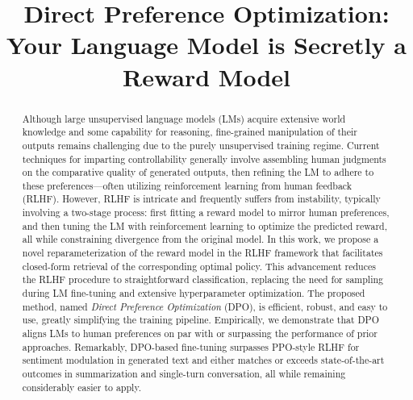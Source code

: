\title{Direct Preference Optimization: Your Language Model is Secretly a Reward Model}

\begin{abstract}
Although large unsupervised language models (LMs) acquire extensive world knowledge and some capability for reasoning, fine-grained manipulation of their outputs remains challenging due to the purely unsupervised training regime. Current techniques for imparting controllability generally involve assembling human judgments on the comparative quality of generated outputs, then refining the LM to adhere to these preferences—often utilizing reinforcement learning from human feedback (RLHF). However, RLHF is intricate and frequently suffers from instability, typically involving a two-stage process: first fitting a reward model to mirror human preferences, and then tuning the LM with reinforcement learning to optimize the predicted reward, all while constraining divergence from the original model. In this work, we propose a novel reparameterization of the reward model in the RLHF framework that facilitates closed-form retrieval of the corresponding optimal policy. This advancement reduces the RLHF procedure to straightforward classification, replacing the need for sampling during LM fine-tuning and extensive hyperparameter optimization. The proposed method, named \textit{Direct Preference Optimization} (DPO), is efficient, robust, and easy to use, greatly simplifying the training pipeline. Empirically, we demonstrate that DPO aligns LMs to human preferences on par with or surpassing the performance of prior approaches. Remarkably, DPO-based fine-tuning surpasses PPO-style RLHF for sentiment modulation in generated text and either matches or exceeds state-of-the-art outcomes in summarization and single-turn conversation, all while remaining considerably easier to apply.
\end{abstract}

